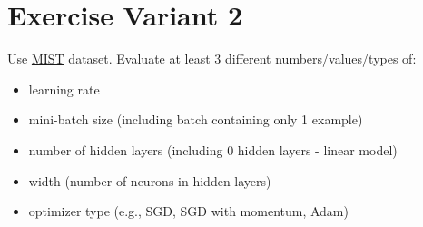 \section{Exercise Variant 2}
Use \href{https://pytorch.org/vision/stable/generated/torchvision.datasets.MNIST.html#torchvision.datasets.MNIST}{MIST} dataset. Evaluate at least 3 different numbers/values/types of:
\begin{itemize}
    \item learning rate
    \item mini-batch size (including batch containing only 1 example)
    \item number of hidden layers (including 0 hidden layers - linear model)
    \item width (number of neurons in hidden layers)
    \item optimizer type (e.g., SGD, SGD with momentum, Adam)
\end{itemize}

